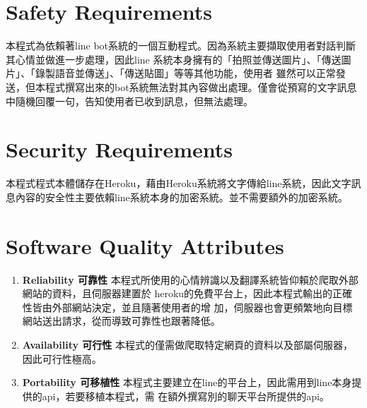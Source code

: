 \documentclass{scrreprt}
\begin{document}
\section{Safety Requirements}
\begin{CJK}{UTF8}{<font>}
本程式為依賴著line bot系統的一個互動程式。因為系統主要擷取使用者對話判斷其心情並做進一步處理，因此line
系統本身擁有的「拍照並傳送圖片」、「傳送圖片」、「錄製語音並傳送」、「傳送貼圖」等等其他功能，使用者
雖然可以正常發送，但本程式撰寫出來的bot系統無法對其內容做出處理。僅會從預寫的文字訊息中隨機回覆一句，告知使用者已收到訊息，但無法處理。
\end{CJK}

\section{Security Requirements}
\begin{CJK}{UTF8}{<font>}
本程式程式本體儲存在Heroku，藉由Heroku系統將文字傳給line系統，因此文字訊息內容的安全性主要依賴line系統本身的加密系統。並不需要額外的加密系統。
\end{CJK}

\section{Software Quality Attributes}
\begin{CJK}{UTF8}{<font>}
    \begin{enumerate} 
    \item \textbf {Reliability 可靠性} \newline
    本程式所使用的心情辨識以及翻譯系統皆仰賴於爬取外部網站的資料，且伺服器建置於
    heroku的免費平台上，因此本程式輸出的正確性皆由外部網站決定，並且隨著使用者的增
    加，伺服器也會更頻繁地向目標網站送出請求，從而導致可靠性也跟著降低。
    \item \textbf {Availability 可行性} \newline
    本程式的僅需做爬取特定網頁的資料以及部屬伺服器，因此可行性極高。
    \item \textbf {Portability 可移植性} \newline
    本程式主要建立在line的平台上，因此需用到line本身提供的api，若要移植本程式，需
    在額外撰寫別的聊天平台所提供的api。
    \end{enumerate}
\end{CJK}
\end{document}
